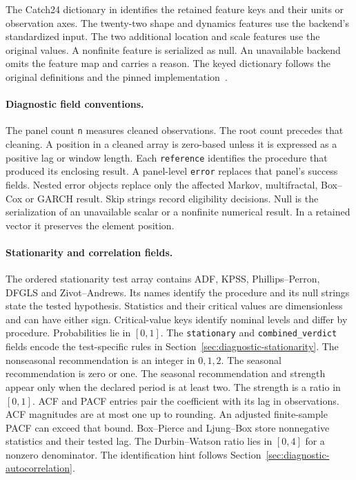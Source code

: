 The Catch24 dictionary in  identifies
the retained feature keys and their units or observation axes. The twenty-two
shape and dynamics features use the backend's standardized input. The two
additional location and scale features use the original values. A nonfinite
feature is serialized as null. An unavailable backend omits the feature map
and carries a reason. The keyed dictionary follows the original definitions
and the pinned implementation~\cite{catch22}.

\paragraph{Diagnostic field conventions.}
The panel count \texttt{n} measures cleaned observations. The root count
precedes that cleaning. A position in a cleaned array is zero-based
unless it is expressed as a positive lag or window length. Each
\texttt{reference} identifies the procedure that produced its enclosing
result. A panel-level \texttt{error} replaces that panel's success
fields. Nested error objects replace only the affected Markov,
multifractal, Box--Cox or GARCH result. Skip strings record eligibility
decisions. Null is the serialization of an unavailable scalar or a
nonfinite numerical result. In a retained vector it preserves the
element position.

\paragraph{Stationarity and correlation fields.}
The ordered stationarity test array contains ADF, KPSS,
Phillips--Perron, DFGLS and Zivot--Andrews. Its names identify the
procedure and its null strings state the tested hypothesis. Statistics
and their critical values are dimensionless and can have either sign.
Critical-value keys identify nominal levels and differ by procedure.
Probabilities lie in $[0,1]$. The \texttt{stationary} and
\texttt{combined\_verdict} fields encode the test-specific rules in
Section~\ref{sec:diagnostic-stationarity}. The nonseasonal recommendation
is an integer in $0,1,2$. The seasonal recommendation is zero or one.
The seasonal recommendation and strength appear only when the declared
period is at least two. The strength is a ratio in $[0,1]$.
ACF and PACF entries pair the coefficient with its lag in observations.
ACF magnitudes are at most one up to rounding. An adjusted finite-sample
PACF can exceed that bound. Box--Pierce and Ljung--Box store nonnegative
statistics and their tested lag. The Durbin--Watson ratio lies in
$[0,4]$ for a nonzero denominator. The identification hint follows
Section~\ref{sec:diagnostic-autocorrelation}.

